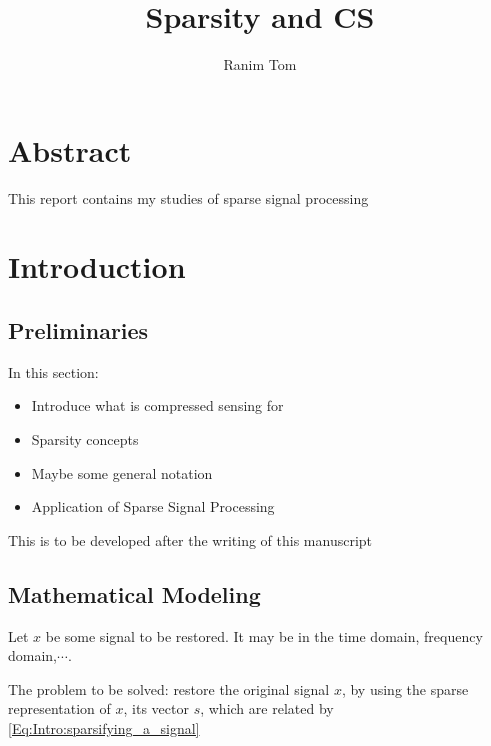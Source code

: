 \documentclass[12pt,a4paper]{book}
\title{Sparsity and CS}
\author{Ranim Tom}
\begin{document}
% 

\maketitle
\tableofcontents

\listoftodos


\pagestyle{fancy}
\fancyhf{} %
\rhead{\rightmark}

\chapter*{Abstract}

This report contains my studies of sparse signal processing

\chapter{Introduction}

\section{Preliminaries}

In this section:

\begin{itemize}
    \item Introduce what is compressed sensing for
    
    \item Sparsity concepts
    
    \item Maybe some general notation
    
    \item Application of Sparse Signal Processing
    
\end{itemize}

This is to be developed after the writing of this manuscript

\section{Mathematical Modeling}


Let $x$ be some signal to be restored. It may be in the time domain, frequency domain,$\cdots$.

The problem to be solved: restore the original signal $x$, by using the sparse representation of $x$, its vector $s$, which are related by \autoref{Eq:Intro:sparsifying_a_signal}
\end{document}
